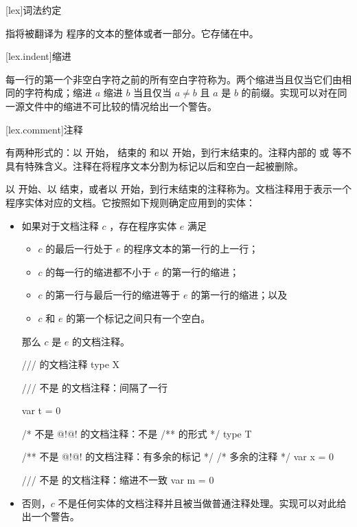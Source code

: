 
[lex]{词法约定}

\pnum
{}指将被翻译为 \X 程序的文本的整体或者一部分。它存储在中。

[lex.indent]{缩进}

\pnum
每一行的第一个非空白字符之前的所有空白字符称为。两个缩进当且仅当它们由相同的字符构成；缩进 $a$ 缩进 $b$ 当且仅当 $a \ne b$ 且 $a$ 是 $b$ 的前缀。实现可以对在同一源文件中的缩进不可比较的情况给出一个警告。

[lex.comment]{注释}

\pnum
有两种形式的：以 \tcode{/*} 开始， \tcode{*/} 结束的 和以 \tcode{//} 开始，到行末结束的。注释内部的 \tcode{/*} 或 \tcode{//} 等不具有特殊含义。注释在将程序文本分割为标记以后和空白一起被删除。

\pnum
以 \tcode{/**} 开始、以 \tcode{*/} 结束，或者以 \tcode{///} 开始，到行末结束的注释称为。文档注释用于表示一个程序实体对应的文档。它按照如下规则确定应用到的实体：

\begin{itemize}

\item
如果对于文档注释 $c$ ，存在程序实体 $e$ 满足

\begin{itemize}

\item
$c$ 的最后一行处于 $e$ 的程序文本的第一行的上一行；

\item
$c$ 的每一行的缩进都不小于 $e$ 的第一行的缩进；

\item
$c$ 的第一行与最后一行的缩进等于 $e$ 的第一行的缩进；以及

\item
$c$ 和 $e$ 的第一个标记之间只有一个空白。

\end{itemize}

那么 $c$ 是 $e$ 的文档注释。\enterexample

\begin{codeblock}
///  的文档注释
type X { }

/// 不是  的文档注释：间隔了一行

var t = 0

/* 不是 @!@! 的文档注释：不是 /** 的形式 */
type T { }

/** 不是 @!@! 的文档注释：有多余的标记 */ /* 多余的注释 */
var x = 0

/// 不是  的文档注释：缩进不一致
    var m = 0
\end{codeblock}

\exitexample

\item
否则，$c$ 不是任何实体的文档注释并且被当做普通注释处理。实现可以对此给出一个警告。

\end{itemize}

